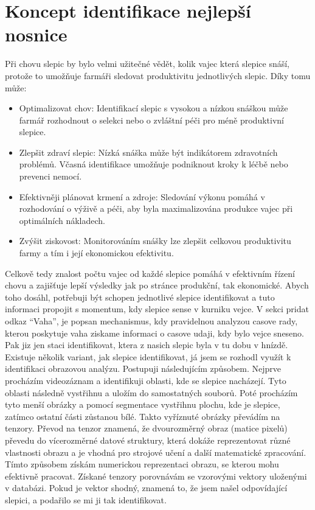 \section{Koncept identifikace nejlepší nosnice}\label{sec:koncept-identifikace-nejlepsi-nosnice}

Při chovu slepic by bylo velmi užitečné vědět, kolik vajec která slepice snáší, protože to umožňuje farmáři sledovat produktivitu jednotlivých slepic.
Díky tomu může:
\begin{itemize}
    \item Optimalizovat chov: Identifikací slepic s vysokou a nízkou snáškou může farmář rozhodnout o selekci nebo o zvláštní péči pro méně produktivní slepice.
    \item Zlepšit zdraví slepic: Nízká snáška může být indikátorem zdravotních problémů. Včasná identifikace umožňuje podniknout kroky k léčbě nebo prevenci nemocí.
    \item Efektivněji plánovat krmení a zdroje: Sledování výkonu pomáhá v rozhodování o výživě a péči, aby byla maximalizována produkce vajec při optimálních nákladech.
    \item Zvýšit ziskovost: Monitorováním snášky lze zlepšit celkovou produktivitu farmy a tím i její ekonomickou efektivitu.
\end{itemize}

Celkově tedy znalost počtu vajec od každé slepice pomáhá v efektivním řízení chovu a zajišťuje lepší výsledky jak po stránce produkční, tak ekonomické.
Abych toho dosáhl, potřebuji být schopen jednotlivé slepice identifikovat a tuto informaci propojit s momentum, kdy slepice sense v kurniku vejce.
V sekci  pridat odkaz  “Vaha”, je popsan mechanismus, kdy pravidelnou analyzou casove rady, kterou poskytuje vaha ziskame informaci o casove udaji, kdy bylo vejce sneseno.
Pak jiz jen staci identifikovat, ktera z nasich slepic byla v tu dobu v hnízdě.
Existuje několik variant, jak slepice identifikovat, já jsem se rozhodl využít k identifikaci obrazovou analýzu.
Postupuji následujícím způsobem.
Nejprve procházím videozáznam a identifikuji oblasti, kde se slepice nacházejí.
Tyto oblasti následně vystřihnu a uložím do samostatných souborů.
Poté procházím tyto menší obrázky a pomocí segmentace vystřihnu plochu, kde je slepice, zatímco ostatní části zůstanou bílé.
Takto vyříznuté obrázky převádím na tenzory.
Převod na tenzor znamená, že dvourozměrný obraz (matice pixelů) převedu do vícerozměrné datové struktury, která dokáže reprezentovat různé vlastnosti obrazu a je vhodná pro strojové učení a další matematické zpracování.
Tímto způsobem získám numerickou reprezentaci obrazu, se kterou mohu efektivně pracovat.
Získané tenzory porovnávám se vzorovými vektory uloženými v databázi.
Pokud je vektor shodný, znamená to, že jsem našel odpovídající slepici, a podařilo se mi ji tak identifikovat.

